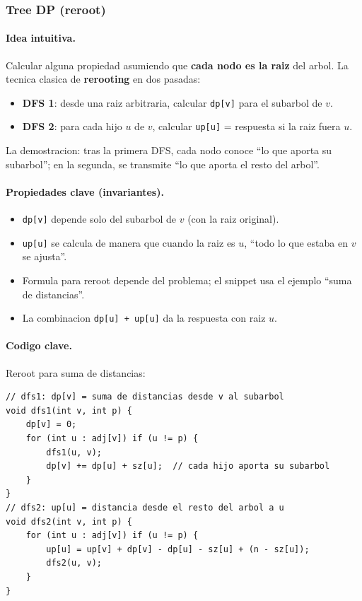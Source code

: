 ﻿\subsubsection{Tree DP (reroot)}

\paragraph{Idea intuitiva.}
Calcular alguna propiedad asumiendo que \textbf{cada nodo es la raiz} del arbol. La tecnica clasica de \textbf{rerooting} en dos pasadas:
\begin{itemize}\setlength\itemsep{0pt}
	\item \textbf{DFS 1}: desde una raiz arbitraria, calcular \texttt{dp[v]} para el subarbol de $v$.
	\item \textbf{DFS 2}: para cada hijo $u$ de $v$, calcular \texttt{up[u]} = respuesta si la raiz fuera $u$.
\end{itemize}
La demostracion: tras la primera DFS, cada nodo conoce ``lo que aporta su subarbol''; en la segunda, se transmite ``lo que aporta el resto del arbol''.

\paragraph{Propiedades clave (invariantes).}
\begin{itemize}\setlength\itemsep{0pt}
	\item \texttt{dp[v]} depende solo del subarbol de $v$ (con la raiz original).
	\item \texttt{up[u]} se calcula de manera que cuando la raiz es $u$, ``todo lo que estaba en $v$ se ajusta''.
	\item Formula para reroot depende del problema; el snippet usa el ejemplo ``suma de distancias''.
	\item La combinacion \texttt{dp[u] + up[u]} da la respuesta con raiz $u$.
\end{itemize}

\paragraph{Codigo clave.}
Reroot para suma de distancias:
\begin{verbatim}
// dfs1: dp[v] = suma de distancias desde v al subarbol
void dfs1(int v, int p) {
    dp[v] = 0;
    for (int u : adj[v]) if (u != p) {
        dfs1(u, v);
        dp[v] += dp[u] + sz[u];  // cada hijo aporta su subarbol
    }
}
// dfs2: up[u] = distancia desde el resto del arbol a u
void dfs2(int v, int p) {
    for (int u : adj[v]) if (u != p) {
        up[u] = up[v] + dp[v] - dp[u] - sz[u] + (n - sz[u]);
        dfs2(u, v);
    }
}
\end{verbatim}

